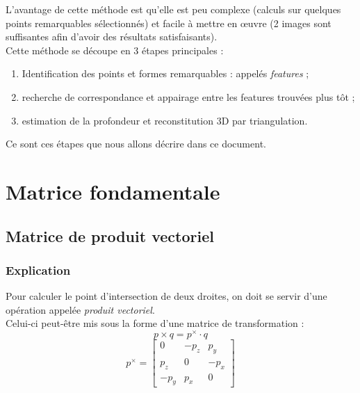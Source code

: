 \documentclass[a4paper]{article}
\begin{document}
L'avantage de cette méthode est qu'elle est peu complexe (calculs sur quelques points remarquables sélectionnés) et facile à mettre en œuvre (2 images sont suffisantes afin d'avoir des résultats satisfaisants).\\

Cette méthode se découpe en 3 étapes principales :
\begin{enumerate}
  \item Identification des points et formes remarquables : appelés {\em features} ;
  \item recherche de correspondance et appairage entre les features trouvées plus tôt ;
  \item estimation de la profondeur et reconstitution 3D par triangulation.
\end{enumerate}

Ce sont ces étapes que nous allons décrire dans ce document.

\clearpage

\section{Matrice fondamentale}

\subsection{Matrice de produit vectoriel}

\subsubsection{Explication}
\label{subs:Explication}

Pour calculer le point d'intersection de deux droites, on doit se servir d'une opération appelée {\em produit vectoriel}.\\
Celui-ci peut-être mis sous la forme d'une matrice de transformation :
\begin{equation}
  p \times q = p^\times \cdot q
\end{equation}
\begin{equation}
  p^\times =
  \begin{bmatrix}
    0 & -p_z & p_y\\
    p_z & 0 & -p_x\\
    -p_y & p_x & 0
  \end{bmatrix}
\end{equation}
\end{document}
